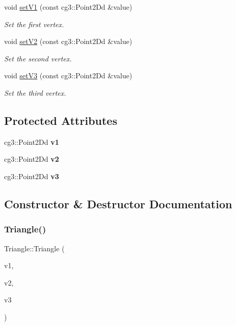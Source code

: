 \begin{DoxyCompactItemize}
void \hyperlink{classTriangle_a5769869c3384056f58410395ccd1a979}{set\+V1} (const cg3\+::\+Point2\+Dd \&value)
\begin{DoxyCompactList}\small\item\em Set the first vertex. \end{DoxyCompactList}\item 
void \hyperlink{classTriangle_aeff8b3fc2c12c3608de55e01f995015a}{set\+V2} (const cg3\+::\+Point2\+Dd \&value)
\begin{DoxyCompactList}\small\item\em Set the second vertex. \end{DoxyCompactList}\item 
void \hyperlink{classTriangle_a0781ccac767888ddda2fa868320d0d6b}{set\+V3} (const cg3\+::\+Point2\+Dd \&value)
\begin{DoxyCompactList}\small\item\em Set the third vertex. \end{DoxyCompactList}\end{DoxyCompactItemize}
\subsection*{Protected Attributes}
\begin{DoxyCompactItemize}
\item 
\mbox{\label{classTriangle_ac28fb730b25c0d52aac1d0faf12b1225}} 
cg3\+::\+Point2\+Dd {\bfseries v1}
\item 
\mbox{\label{classTriangle_a6d59f8e4f22f7436b6298051d24ae977}} 
cg3\+::\+Point2\+Dd {\bfseries v2}
\item 
\mbox{\label{classTriangle_a8eb4459eb8ead2fc99742e2846d59264}} 
cg3\+::\+Point2\+Dd {\bfseries v3}
\end{DoxyCompactItemize}


\subsection{Constructor \& Destructor Documentation}
\mbox{\label{classTriangle_a3bb081f3c4d90284e27e1005a2b33599}} 
\subsubsection{\texorpdfstring{Triangle()}{Triangle()}}
{\footnotesize\ttfamily Triangle\+::\+Triangle (\begin{DoxyParamCaption}\item[{const cg3\+::\+Point2\+Dd \&}]{v1,  }\item[{const cg3\+::\+Point2\+Dd \&}]{v2,  }\item[{const cg3\+::\+Point2\+Dd \&}]{v3 }\end{DoxyParamCaption})}



